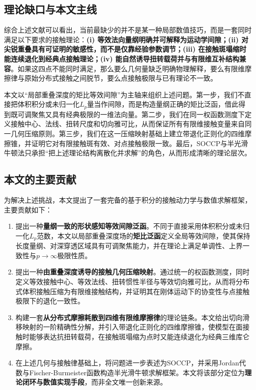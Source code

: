 ﻿\documentclass[12pt, a4paper]{ctexart}
\theoremstyle{plain}
\theoremstyle{remark}
\begin{document}
\subsection{理论缺口与本文主线}
综合上述文献可以看出，当前最缺少的并不是某一种局部数值技巧，而是一套同时满足以下要求的接触理论：\textbf{(i) 等效法向量纲明确并可解释为运动学间隙；(ii) 对尖锐重叠具有可证明的敏感性，而不是仅靠经验参数调节；(iii) 在接触斑塌缩时能连续退化到经典点接触理论；(iv) 能自然诱导扭转载荷并与有限维互补结构兼容}。如果这四点不能同时满足，那么要么几何量缺乏明确物理解释，要么有限维摩擦律与原始分布式接触之间脱节，要么点接触极限与已有理论不一致。

本文以“局部重叠深度的矩比等效间隙”为主轴来组织上述问题。第一步，我们不直接把体积积分或未归一化$L_p$量当作间隙，而是构造量纲正确的矩比泛函，借此得到既可调聚焦又具有经典极限的一维法向量。第二步，我们在同一权函数测度下定义接触中心、法线、扭转尺度和切向雅可比，从而保证所有有限维接触变量来自同一几何压缩原则。第三步，我们在这一压缩映射基础上建立带退化正则化的四维摩擦锥，并证明它对有限接触斑有效、对点接触极限一致。最后，SOCCP与半光滑牛顿法只承担“把上述理论结构离散化并求解”的角色，从而形成清晰的理论层次。

\subsection{本文的主要贡献}
为解决上述挑战，本文提出了一套完备的基于积分的接触动力学与数值求解框架，主要贡献如下：
\begin{enumerate}
    \item 提出一种\textbf{量纲一致的形状感知等效间隙泛函}。不同于直接采用体积积分或未归一化$L_p$范数，本文以局部重叠深度场的\textbf{矩比泛函}定义全局等效间隙，使其保持长度量纲、对深穿透区域具有可调聚焦能力，并在理论上满足单调性、上界一致性与$p \to \infty$极限性质。
    \item 提出一种\textbf{由重叠深度诱导的接触几何压缩映射}。通过统一的权函数测度，同时定义等效接触中心、等效法线、扭转惯性半径与等效切向雅可比，从而将分布式体积接触压缩为有限维接触结构，并证明其在刚体运动下的协变性与点接触极限下的退化一致性。
    \item 构建一套\textbf{从分布式摩擦耗散到四维有限维摩擦律}的理论链条。本文给出切向滑移映射的一阶精确性分解，并引入带退化正则化的四维摩擦锥，使模型在面接触时能够表达抗扭转载荷，在接触斑塌缩为点时又能连续退化为经典三维库仑摩擦。
    \item 在上述几何与接触律基础上，将问题进一步表述为SOCCP，并采用Jordan代数与Fischer-Burmeister函数构造半光滑牛顿求解框架。本文将该部分定位为\textbf{理论闭环与数值实现手段}，而非全文唯一创新来源。
\end{enumerate}
\end{document}
